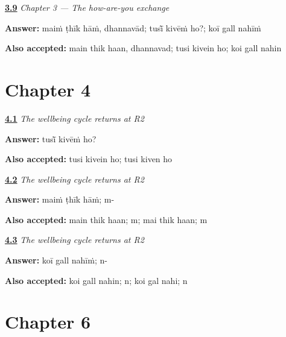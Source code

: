 \noindent\begin{minipage}[t]{\linewidth}
\raggedright
\hyperlink{review-PA-C03-practice-speaking}{\textbf{3.9}} \emph{Chapter 3 — The how-are-you exchange}\par
\small \textbf{Answer:} maiṁ ṭhīk hāṁ, dhannavād; tusī̃ kivēṁ ho?; koī gall nahīṁ\par
\footnotesize \textbf{Also accepted:} main thik haan, dhannavad; tusi kivein ho; koi gall nahin
\end{minipage}\par\medskip

\section*{Chapter 4}

\noindent\begin{minipage}[t]{\linewidth}
\raggedright
\hyperlink{review-PA-R04-wellbeing-r2-question}{\textbf{4.1}} \emph{The wellbeing cycle returns at R2}\par
\small \textbf{Answer:} tusī̃ kivēṁ ho?\par
\footnotesize \textbf{Also accepted:} tusi kivein ho; tusi kiven ho
\end{minipage}\par\medskip

\noindent\begin{minipage}[t]{\linewidth}
\raggedright
\hyperlink{review-PA-R04-wellbeing-r2-reply}{\textbf{4.2}} \emph{The wellbeing cycle returns at R2}\par
\small \textbf{Answer:} maiṁ ṭhīk hāṁ; m-\par
\footnotesize \textbf{Also accepted:} main thik haan; m; mai thik haan; m
\end{minipage}\par\medskip

\noindent\begin{minipage}[t]{\linewidth}
\raggedright
\hyperlink{review-PA-R04-wellbeing-r2-close}{\textbf{4.3}} \emph{The wellbeing cycle returns at R2}\par
\small \textbf{Answer:} koī gall nahīṁ; n-\par
\footnotesize \textbf{Also accepted:} koi gall nahin; n; koi gal nahi; n
\end{minipage}\par\medskip

\section*{Chapter 6}

